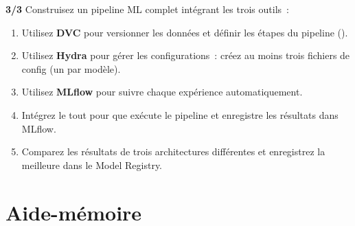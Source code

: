 \begin{exercice}
\textbf{3/3}
Construisez un pipeline ML complet int\'egrant les trois outils~:
\begin{enumerate}
  \item Utilisez \textbf{DVC} pour versionner les donn\'ees et d\'efinir les
        \'etapes du pipeline ().
  \item Utilisez \textbf{Hydra} pour g\'erer les configurations~: cr\'eez au
        moins trois fichiers de config (un par mod\`ele).
  \item Utilisez \textbf{MLflow} pour suivre chaque exp\'erience
        automatiquement.
  \item Int\'egrez le tout pour que  ex\'ecute le pipeline et
        enregistre les r\'esultats dans MLflow.
  \item Comparez les r\'esultats de trois architectures diff\'erentes et
        enregistrez la meilleure dans le Model Registry.
\end{enumerate}
\end{exercice}

\section{Aide-m\'emoire}
\label{sec:cheatsheet-suivi-experiences}

